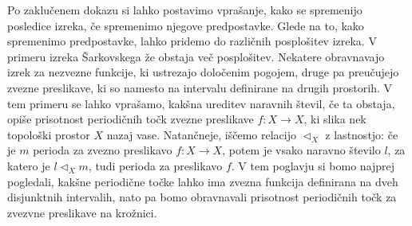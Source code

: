 \documentclass[../TG_magistrsko_delo_sections.tex]{subfiles}
\begin{document}
Po zaklučenem dokazu si lahko postavimo vprašanje, kako se spremenijo posledice izreka, če spremenimo njegove predpostavke. Glede na to, kako spremenimo predpostavke, lahko pridemo do različnih posplošitev izreka. V primeru izreka Šarkovskega že obstaja več posplošitev. Nekatere obravnavajo izrek za nezvezne funkcije, ki ustrezajo določenim pogojem, druge pa preučujejo zvezne preslikave, ki so namesto na intervalu definirane na drugih prostorih. V tem primeru se lahko vprašamo, kakšna ureditev naravnih števil, če ta obstaja, opiše prisotnost periodičnih točk zvezne preslikave $f:X \to X$, ki slika nek topološki prostor $X$ nazaj vase.  Natančneje, iščemo relacijo $\triangleleft_X$ z lastnostjo: če je $m$ perioda za zvezno preslikavo $f:X \to X$, potem je vsako naravno število $l$, za katero je $l \triangleleft_X m$, tudi perioda za preslikavo $f$.
V tem poglavju si bomo najprej pogledali, kakšne periodične točke lahko ima zvezna funkcija definirana na dveh disjunktnih intervalih, nato pa bomo obravnavali prisotnost periodičnih točk za zvezvne preslikave na krožnici.

\end{document}
